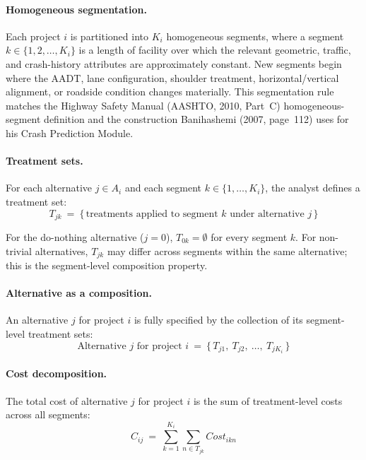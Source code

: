 \paragraph{Homogeneous segmentation.} Each project $i$ is partitioned into
$K_i$ homogeneous segments, where a segment $k \in \{1, 2, \ldots, K_i\}$
is a length of facility over which the relevant geometric, traffic, and
crash-history attributes are approximately constant. New segments begin
where the AADT, lane configuration, shoulder treatment, horizontal/vertical
alignment, or roadside condition changes materially. This segmentation rule
matches the Highway Safety Manual (AASHTO, 2010, Part~C) homogeneous-segment
definition and the construction Banihashemi (2007, page~112) uses for his
Crash Prediction Module.

\paragraph{Treatment sets.} For each alternative $j \in A_i$ and each
segment $k \in \{1, \ldots, K_i\}$, the analyst defines a treatment set:
\begin{equation*}
T_{jk}\ =\ \{\,\text{treatments applied to segment } k \text{ under alternative } j\,\}
\end{equation*}

\noindent For the do-nothing alternative ($j = 0$), $T_{0k} = \emptyset$ for
every segment $k$. For non-trivial alternatives, $T_{jk}$ may differ across
segments within the same alternative; this is the segment-level composition
property.

\paragraph{Alternative as a composition.} An alternative $j$ for project $i$
is fully specified by the collection of its segment-level treatment sets:
\begin{equation*}
\text{Alternative } j \text{ for project } i\ =\ \{\, T_{j1},\ T_{j2},\ \ldots,\ T_{jK_i} \,\}
\end{equation*}

\paragraph{Cost decomposition.} The total cost of alternative $j$ for
project $i$ is the sum of treatment-level costs across all segments:
\begin{equation}
C_{ij}\ =\ \sum_{k=1}^{K_i} \sum_{n \in T_{jk}} \mathit{Cost}_{ikn}
\label{eq:cost-decomp}
\end{equation}

